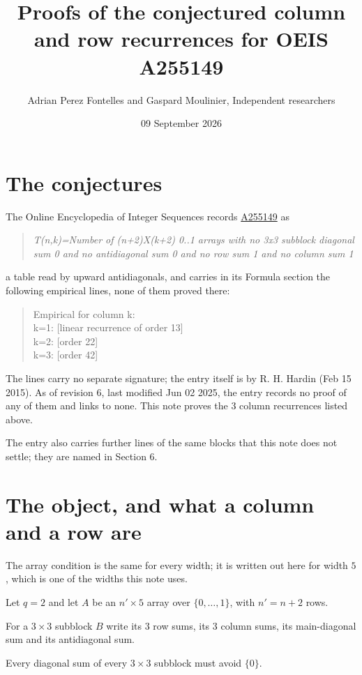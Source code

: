 \documentclass[11pt]{article}
\title{Proofs of the conjectured column and row recurrences for OEIS A255149}
\author{Adrian Perez Fontelles and Gaspard Moulinier, Independent researchers}
\date{09 September 2026}
\theoremstyle{definition}
\begin{document}
\maketitle
\section{The conjectures}

The Online Encyclopedia of Integer Sequences records \href{https://oeis.org/A255149}{A255149} as

\begin{quote}\itshape T(n,k)=Number of (n+2)X(k+2) 0..1 arrays with no 3x3 subblock diagonal sum 0 and no antidiagonal sum 0 and no row sum 1 and no column sum 1\end{quote}

a table read by upward antidiagonals, and carries in its Formula section the following empirical lines, none of them proved there:

\begin{quote}\ttfamily Empirical for column k:\\
k=1: [linear recurrence of order 13]\\k=2: [order 22]\\k=3: [order 42]\end{quote}

The lines carry no separate signature; the entry itself is by R. H. Hardin (Feb 15 2015). As of revision 6, last modified Jun 02 2025, the entry records no proof of any of them and links to none. This note proves the 3 column recurrences listed above.

The entry also carries further lines of the same blocks that this note does not settle; they are named in Section 6.

\section{The object, and what a column and a row are}

The array condition is the same for every width; it is written out here for width $5$, which is one of the widths this note uses.

Let $q = 2$ and let $A$ be an $n' \times 5$ array over $\{0,\dots,1\}$, with $n' = n + 2$ rows.

For a $3\times3$ subblock $B$ write its 3 row sums, its 3 column sums, its main-diagonal sum and its antidiagonal sum.

Every diagonal sum of every $3\times3$ subblock must avoid $\{0\}$.
\end{document}
